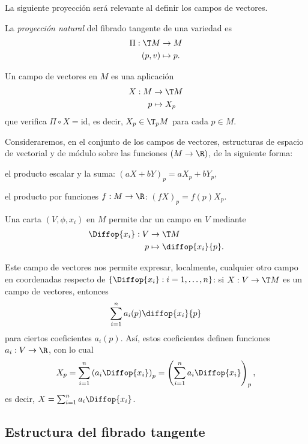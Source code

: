 La siguiente proyección será relevante al definir los campos de vectores.
\begin{ndef}
  La \emph{proyección natural} del fibrado tangente de una variedad es
  \begin{alignat*}{2}
    \Pi: \T M & \to M \\
   (p,v) & \mapsto p.
  \end{alignat*}
\end{ndef}

\begin{ndef}
  Un campo de vectores en $M$ es una aplicación
  \begin{alignat*}{2}
    X: M & \to \T M \\
   p & \mapsto X_{p}
  \end{alignat*}
  que verifica $\Pi\circ X=\mathrm{id}$, es decir, $X_{p}\in \T_{p}M$ para cada
  $p\in M$.
\end{ndef}

Consideraremos, en el conjunto de los campos de vectores, estructuras de espacio
de vectorial y de módulo sobre las funciones $(M\to \R)$, de la siguiente forma:
\begin{nlist}
\item
  el producto escalar y la suma: $(aX+bY)_{p} = aX_{p}+bY_{p}$,
\item
  el producto por funciones $f: M\to\R$: $(fX)_{p} = f(p)X_{p}$.
\end{nlist}

\begin{ejemplo}
  Una carta $(V,\phi,x_{i})$ en $M$ permite dar un campo en $V$ mediante
  \begin{alignat*}{2}
    \Diffop{x_{i}}: V  & \to \T M \\
    p & \mapsto \diffop{x_{i}}{p}.
  \end{alignat*}
\end{ejemplo}
Este campo de vectores nos permite expresar, localmente, cualquier otro campo en
coordenadas respecto de $\left\{ \Diffop{x_{i}} : i=1,\dots,n \right\}$: si $X:
V \to \T M$ es un campo de vectores, entonces
\[
  \sum_{i=1}^{n} a_{i}(p)\diffop{x_{i}}{p}
\]
para ciertos coeficientes $a_{i}(p)$. Así, estos coeficientes definen funciones
$a_{i}: V\to\R$, con lo cual
\[
  X_{p} = \sum_{i=1}^{n}\left( a_{i}\Diffop{x_{i}} \right)_{p} = \left(
    \sum_{i=1}^{n} a_{i} \Diffop{x_{i}} \right)_{p}
,\]
es decir, $X = \sum_{i=1}^{n}a_{i}\Diffop{x_{i}}$.

\subsection{Estructura del fibrado tangente}


